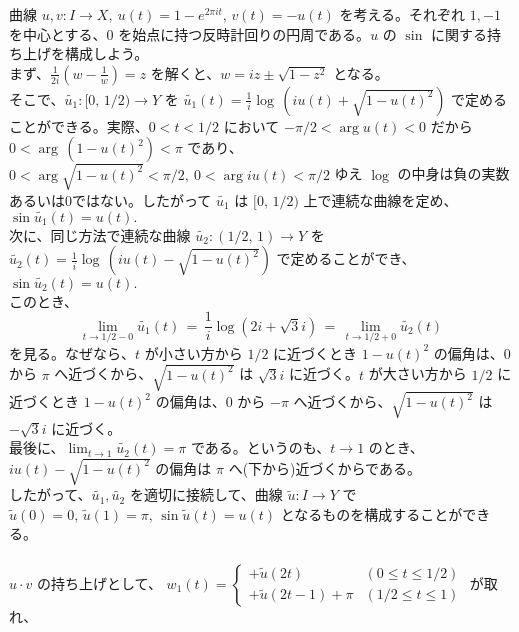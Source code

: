 \documentclass{jsarticle}
\theoremstyle{definition}
\begin{document}
    曲線 $u, v : I \rightarrow X, \ u(t) = 1 - e^{2\pi it}, \, v(t) = -u(t)$ を考える。それぞれ $1, -1$ を中心とする、$0$ を始点に持つ反時計回りの円周である。$u$ の $\sin$ に関する持ち上げを構成しよう。\\
    
    まず、$\displaystyle \frac{1}{2i}\left(w - \frac{1}{w}\right) = z$ を解くと、$w = iz \pm \sqrt{1 - z^2}$ となる。\\
    
    そこで、$\widetilde{u_1} : [0, \, 1/2) \rightarrow Y$ を $\displaystyle \widetilde{u_1}(t) = \frac{1}{i}\log \,(iu(t) + \sqrt{1 - u(t)^2})$ で定めることができる。実際、$0 < t < 1/2$ において $-\pi/2 < \arg u(t) < 0$ だから $0 < \arg \,(1-u(t)^2) < \pi$ であり、$0 < \arg \sqrt{1-u(t)^2} < \pi/2, \ 0 < \arg iu(t) < \pi/2$ ゆえ $\log$ の中身は負の実数あるいは0ではない。したがって $\widetilde{u_1}$ は $[0, \, 1/2)$ 上で連続な曲線を定め、$\sin \widetilde{u_1}(t) = u(t).$\\
    次に、同じ方法で連続な曲線 $\widetilde{u_2} : (1/2, \, 1) \rightarrow Y$ を $\displaystyle \widetilde{u_2}(t) = \frac{1}{i}\log \,(iu(t) - \sqrt{1 - u(t)^2})$ で定めることができ、$\sin \widetilde{u_2}(t) = u(t).$\\
    このとき、$$\displaystyle \lim_{t \to 1/2 - 0} \widetilde{u_1}(t) \,=\, \frac{1}{i}\log(2i + \sqrt{3}i) \,=\, \lim_{t \to 1/2 + 0} \widetilde{u_2}(t)$$ を見る。なぜなら、$t$ が小さい方から $1/2$ に近づくとき $1-u(t)^2$ の偏角は、0 から $\pi$ へ近づくから、$\sqrt{1-u(t)^2}$ は $\sqrt{3}i$ に近づく。$t$ が大さい方から $1/2$ に近づくとき $1-u(t)^2$ の偏角は、0 から $-\pi$ へ近づくから、$\sqrt{1-u(t)^2}$ は $-\sqrt{3}i$ に近づく。\\
    最後に、$\displaystyle\lim_{t \to 1} \widetilde{u_2}(t) = \pi$ である。というのも、$t \to 1$ のとき、$iu(t)-\sqrt{1-u(t)^2}$ の偏角は $\pi$ へ(下から)近づくからである。\\
    したがって、$\widetilde{u_1}, \widetilde{u_2}$ を適切に接続して、曲線 $\widetilde{u} : I \rightarrow Y$ で $\widetilde{u}(0) = 0,\, \widetilde{u}(1) = \pi, \, \sin \widetilde{u}(t) = u(t)$ となるものを構成することができる。\\
    \ \\
    $u \cdot v$ の持ち上げとして、
    $w_1(t) = \left\{
    \begin{array}{ll}
    +\widetilde{u}(2t) & (0 \leq t \leq 1/2) \\
    +\widetilde{u}(2t-1) + \pi & (1/2 \leq t \leq 1)
    \end{array}
    \right.$ が取れ、\\
\end{document}

